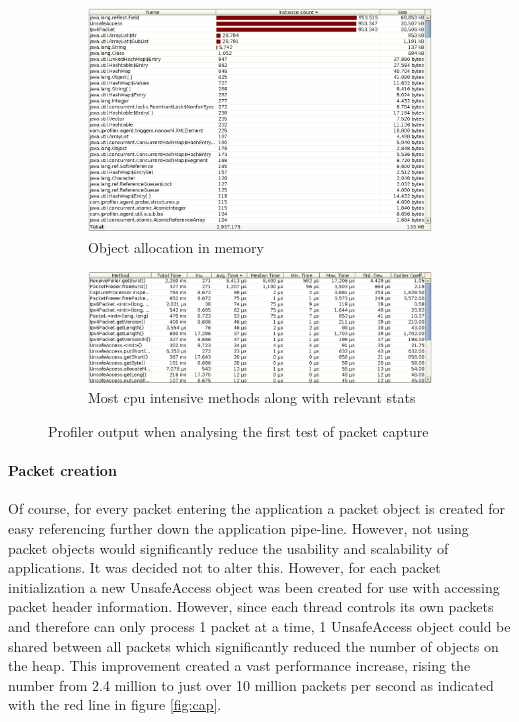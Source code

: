\documentclass[final_report.tex]{subfiles}
\begin{document}
\begin{figure}[H]
	\centering
	\begin{subfigure}{0.5\textwidth}
		\includegraphics[width=\textwidth]{../../data/pctest2/memory_all_objects.png}
		\caption{Object allocation in memory}
		\label{fig:mem2}
	\end{subfigure}%
	\begin{subfigure}{0.5\textwidth}
		\includegraphics[width=\textwidth]{../../data/pctest1/cpu_methods.png}
		\caption{Most cpu intensive methods along with relevant stats}
		\label{fig:cpu2}
	\end{subfigure}
	\caption{Profiler output when analysing the first test of packet capture}
	\label{fig:pro2}
\end{figure}

\paragraph*{Packet creation}
Of course, for every packet entering the application a packet object is created for easy referencing further down the application pipe-line. However, not using packet objects would significantly reduce the usability and scalability of applications. It was decided not to alter this. However, for each packet initialization a new UnsafeAccess object was been created for use with accessing packet header information. However, since each thread controls its own packets and therefore can only process 1 packet at a time, 1 UnsafeAccess object could be shared between all packets which significantly reduced the number of objects on the heap. This improvement created a vast performance increase, rising the number from 2.4 million to just over 10 million packets per second as indicated with the red line in figure \ref{fig:cap}.
\end{document}
